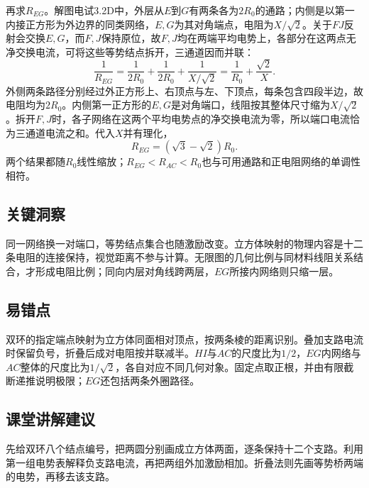 \documentclass[UTF8,fontset=fandol,a4paper,11pt]{ctexart}
\begin{document}
再求$R_{EG}$。解图电试3.2D中，外层从$E$到$G$有两条各为$2R_0$的通路；内侧是以第一内接正方形为外边界的同类网络，$E,G$为其对角端点，电阻为$X/\sqrt2$。关于$FJ$反射会交换$E,G$，而$F,J$保持原位，故$F,J$均在两端平均电势上，各部分在这两点无净交换电流，可将这些等势结点拆开，三通道因而并联：
\[
\frac1{R_{EG}}=\frac1{2R_0}+\frac1{2R_0}
+\frac1{X/\sqrt2}
=\frac1{R_0}+\frac{\sqrt2}{X}.
\]
外侧两条路径分别经过外正方形上、右顶点与左、下顶点，每条包含四段半边，故电阻均为$2R_0$。内侧第一正方形的$E,G$是对角端口，线阻按其整体尺寸缩为$X/\sqrt2$。拆开$F,J$时，各子网络在这两个平均电势点的净交换电流为零，所以端口电流恰为三通道电流之和。代入$X$并有理化，
\[
\boxed{R_{EG}=(\sqrt3-\sqrt2)R_0}.
\]
两个结果都随$R_0$线性缩放；$R_{EG}<R_{AC}<R_0$也与可用通路和正电阻网络的单调性相符。




\subsection*{关键洞察}

同一网络换一对端口，等势结点集合也随激励改变。立方体映射的物理内容是十二条电阻的连接保持，视觉距离不参与计算。无限图的几何比例与同材料线阻关系结合，才形成电阻比例；同向内层对角线跨两层，$EG$所接内网络则只缩一层。



\subsection*{易错点}

双环的指定端点映射为立方体同面相对顶点，按两条棱的距离识别。叠加支路电流时保留负号，折叠后成对电阻按并联减半。$HI$与$AC$的尺度比为$1/2$，$EG$内网络与$AC$整体的尺度比为$1/\sqrt2$，各自对应不同几何对象。固定点取正根，并由有限截断递推说明极限；$EG$还包括两条外圈路径。



\subsection*{课堂讲解建议}

先给双环八个结点编号，把两圆分别画成立方体两面，逐条保持十二个支路。利用第一组电势表解释负支路电流，再把两组外加激励相加。折叠法则先画等势桥两端的电势，再移去该支路。
\end{document}
